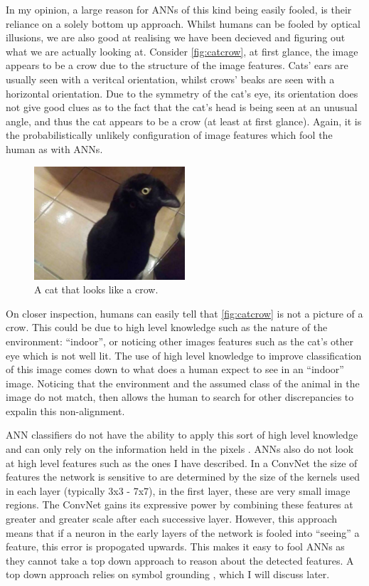 In my opinion, a large reason for \acp{ANN} of this kind being easily fooled, is their reliance on a solely bottom up approach. Whilst humans can be fooled by optical illusions, we are also good at realising we have been decieved and figuring out what we are actually looking at. Consider \autoref{fig:catcrow}, at first glance, the image appears to be a crow due to the structure of the image features. Cats' ears are usually seen with a veritcal orientation, whilst crows' beaks are seen with a horizontal orientation. Due to the symmetry of the cat's eye, its orientation does not give good clues as to the fact that the cat's head is being seen at an unusual angle, and thus the cat appears to be a crow (at least at first glance). Again, it is the probabilistically unlikely configuration of image features which fool the human as with \acp{ANN}.

\begin{figure}
\centering
\includegraphics[width=0.5\textwidth]{Figs/litReview/catcrow.jpeg}
\caption{A cat that looks like a crow.}
\label{fig:catcrow}

\end{figure}

On closer inspection, humans can easily tell that \autoref{fig:catcrow} is not a picture of a crow. This could be due to high level knowledge such as the nature of the environment: ``indoor'', or noticing other images features such as the cat's other eye which is not well lit. The use of high level knowledge to improve classification of this image comes down to what does a human expect to see in an ``indoor'' image. Noticing that the environment and the assumed class of the animal in the image do not match, then allows the human to search for other discrepancies to expalin this non-alignment.

\ac{ANN} classifiers do not have the ability to apply this sort of high level knowledge and can only rely on the information held in the pixels . \acp{ANN} also do not look at high level features such as the ones I have described. In a \ac{ConvNet} the size of features the network is sensitive to are determined by the size of the kernels used in each layer (typically 3x3 - 7x7), in the first layer, these are very small image regions. The \ac{ConvNet} gains its expressive power by combining these features at greater and greater scale after each successive layer. However, this approach means that if a neuron in the early layers of the network is fooled into ``seeing'' a feature, this error is propogated upwards. This makes it easy to fool \acp{ANN} as they cannot take a top down approach to reason about the detected features. A top down approach relies on symbol grounding \cite{barsalou2008grounded}, which I will discuss later.



